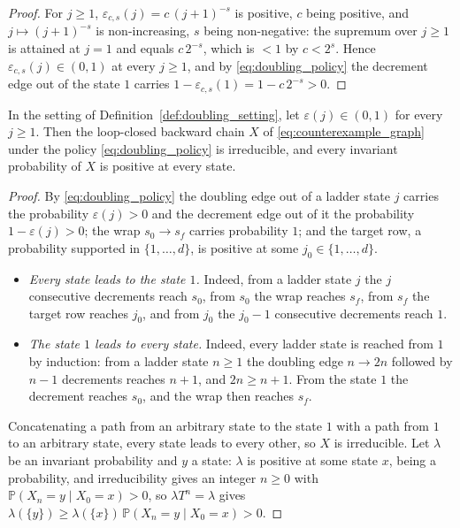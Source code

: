 \begin{proof}
For $j\geq1$, $\varepsilon_{c,s}(j)=c\,(j+1)^{-s}$ is positive, $c$ being positive, and
$j\mapsto(j+1)^{-s}$ is non-increasing, $s$ being non-negative: the supremum over $j\geq1$ is
attained at $j=1$ and equals $c\,2^{-s}$, which is $<1$ by $c<2^s$. Hence
$\varepsilon_{c,s}(j)\in(0,1)$ at every $j\geq1$, and by \eqref{eq:doubling_policy} the
decrement edge out of the state $1$ carries $1-\varepsilon_{c,s}(1)=1-c\,2^{-s}>0$.
\end{proof}

\begin{lemma}\label{lem:doubling_irreducible}
In the setting of Definition~\ref{def:doubling_setting}, let $\varepsilon(j)\in(0,1)$ for every
$j\geq1$. Then the loop-closed backward chain $X$ of \eqref{eq:counterexample_graph} under the
policy \eqref{eq:doubling_policy} is irreducible, and every invariant probability of $X$ is
positive at every state.
\end{lemma}

\begin{proof}
By \eqref{eq:doubling_policy} the doubling edge out of a ladder state $j$ carries the
probability $\varepsilon(j)>0$ and the decrement edge out of it the probability
$1-\varepsilon(j)>0$; the wrap $s_0\rightarrow s_f$ carries probability $1$; and the target
row, a probability supported in $\{1,\dots,d\}$, is positive at some $j_0\in\{1,\dots,d\}$.
\begin{itemize}
    \item \emph{Every state leads to the state $1$.} Indeed, from a ladder state $j$ the $j$
    consecutive decrements reach $s_0$, from $s_0$ the wrap reaches $s_f$, from $s_f$ the target
    row reaches $j_0$, and from $j_0$ the $j_0-1$ consecutive decrements reach $1$.
    \item \emph{The state $1$ leads to every state.} Indeed, every ladder state is reached from
    $1$ by induction: from a ladder state $n\geq1$ the doubling edge $n\rightarrow2n$ followed
    by $n-1$ decrements reaches $n+1$, and $2n\geq n+1$. From the state $1$ the decrement
    reaches $s_0$, and the wrap then reaches $s_f$.
\end{itemize}
Concatenating a path from an arbitrary state to the state $1$ with a path from $1$ to an
arbitrary state, every state leads to every other, so $X$ is irreducible. Let $\lambda$ be an
invariant probability and $y$ a state: $\lambda$ is positive at some state $x$, being a
probability, and irreducibility gives an integer $n\geq0$ with
$\mathbb P(X_n=y\mid X_0=x)>0$, so $\lambda T^n=\lambda$ gives
$\lambda(\{y\})\geq\lambda(\{x\})\,\mathbb P(X_n=y\mid X_0=x)>0$.
\end{proof}

